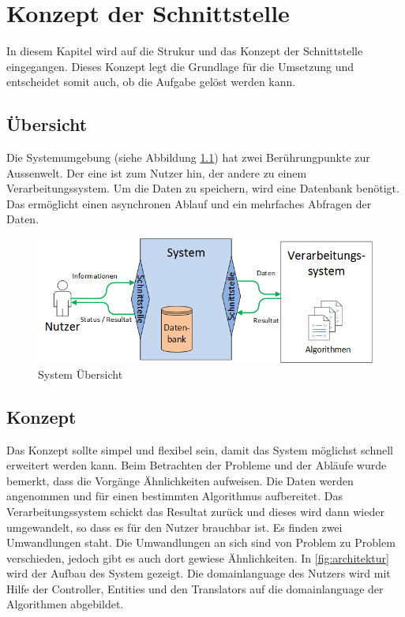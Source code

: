 %
%

\chapter{Konzept der Schnittstelle \resultAssignment{[R4]}}\label{chap.architektur}
In diesem Kapitel wird auf die Strukur und das Konzept der Schnittstelle eingegangen. Dieses Konzept legt die Grundlage für die Umsetzung und entscheidet somit auch, ob die 
Aufgabe gelöst werden kann.

\section{Übersicht}\label{architektur_uebersicht}
Die Systemumgebung (siehe Abbildung \ref{fig:system_scope}) hat zwei Berührungpunkte zur Aussenwelt. Der eine ist zum Nutzer hin, der andere zu einem Verarbeitungssystem. 
Um die Daten zu speichern, wird eine Datenbank benötigt. Das ermöglicht einen asynchronen Ablauf und ein mehrfaches Abfragen der Daten.
\begin{figure}[h]
\centering
\includegraphics[scale=0.8]{images/visio/SystemScope.png}
\caption[System Übersicht]{System Übersicht \selfmade{}}
\label{fig:system_scope}
\end{figure}

\section{Konzept}\label{arch_backend}
Das Konzept sollte simpel und flexibel sein, damit das System möglichst schnell erweitert werden kann. Beim Betrachten der Probleme und der Abläufe wurde bemerkt, dass die Vorgänge 
Ähnlichkeiten aufweisen. Die Daten werden angenommen und für einen bestimmten Algorithmus aufbereitet. Das Verarbeitungssystem schickt das Resultat zurück und dieses wird dann 
wieder umgewandelt, so dass es für den Nutzer brauchbar ist. Es finden zwei Umwandlungen staht. Die Umwandlungen an sich sind von Problem zu Problem verschieden, jedoch gibt es 
auch dort gewiese Ähnlichkeiten. In \autoref{fig:architektur} wird der Aufbau des System gezeigt. Die  \gls{domainlanguage} des Nutzers wird mit Hilfe der Controller, Entities und 
den Translators auf die \gls{domainlanguage} der Algorithmen abgebildet.

